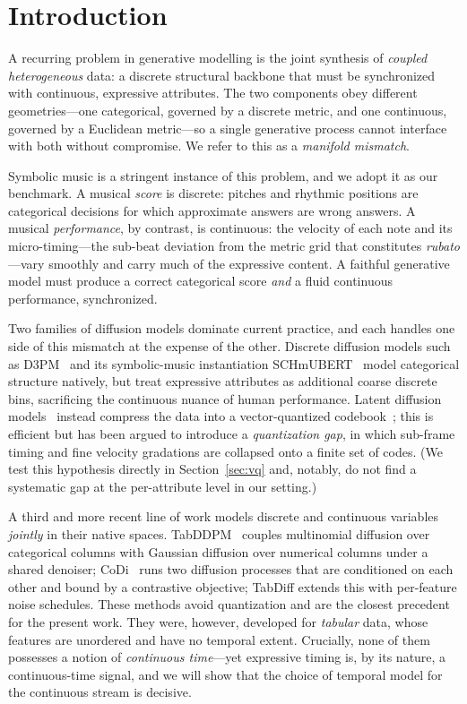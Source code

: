 \documentclass[review]{elsarticle}
\begin{document}
\section{Introduction}
\label{sec:intro}

A recurring problem in generative modelling is the joint synthesis of \emph{coupled
heterogeneous} data: a discrete structural backbone that must be synchronized with
continuous, expressive attributes. The two components obey different geometries---one
categorical, governed by a discrete metric, and one continuous, governed by a Euclidean
metric---so a single generative process cannot interface with both without compromise.
We refer to this as a \emph{manifold mismatch}.

Symbolic music is a stringent instance of this problem, and we adopt it as our benchmark.
A musical \emph{score} is discrete: pitches and rhythmic positions are categorical
decisions for which approximate answers are wrong answers. A musical \emph{performance},
by contrast, is continuous: the velocity of each note and its micro-timing---the
sub-beat deviation from the metric grid that constitutes \emph{rubato}---vary smoothly
and carry much of the expressive content. A faithful generative model must produce a
correct categorical score \emph{and} a fluid continuous performance, synchronized.

Two families of diffusion models dominate current practice, and each handles one side of
this mismatch at the expense of the other. Discrete diffusion models such as
D3PM~\cite{austin2021d3pm} and its symbolic-music instantiation
SCHmUBERT~\cite{plasser2023schmubert} model categorical structure natively, but treat
expressive attributes as additional coarse discrete bins, sacrificing the continuous
nuance of human performance. Latent diffusion models~\cite{zhang2024latent,
huang2024vqdiffusion} instead compress the data into a vector-quantized
codebook~\cite{vandenoord2017vqvae}; this is efficient but has been argued to introduce a
\emph{quantization gap}, in which sub-frame timing and fine velocity gradations are
collapsed onto a finite set of codes. (We test this hypothesis directly in
Section~\ref{sec:vq} and, notably, do not find a systematic gap at the per-attribute level
in our setting.)

A third and more recent line of work models discrete and continuous variables
\emph{jointly} in their native spaces. TabDDPM~\cite{kotelnikov2023tabddpm} couples
multinomial diffusion over categorical columns with Gaussian diffusion over numerical
columns under a shared denoiser; CoDi~\cite{lee2023codi} runs two diffusion processes
that are conditioned on each other and bound by a contrastive objective; TabDiff
\cite{shi2024tabdiff} extends this with per-feature noise schedules. These methods avoid
quantization and are the closest precedent for the present work. They were, however,
developed for \emph{tabular} data, whose features are unordered and have no temporal
extent. Crucially, none of them possesses a notion of \emph{continuous time}---yet
expressive timing is, by its nature, a continuous-time signal, and we will show that the
choice of temporal model for the continuous stream is decisive.
\end{document}
